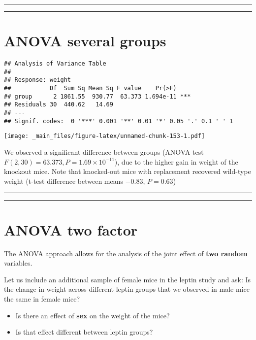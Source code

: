 \documentclass[
]{book}
\begin{document}
\begin{center}\rule{0.5\linewidth}{0.5pt}\end{center}

\begin{center}\rule{0.5\linewidth}{0.5pt}\end{center}

\hypertarget{anova-several-groups-4}{%
\section{ANOVA several groups}\label{anova-several-groups-4}}

\begin{verbatim}
## Analysis of Variance Table
## 
## Response: weight
##           Df  Sum Sq Mean Sq F value    Pr(>F)    
## group      2 1861.55  930.77  63.373 1.694e-11 ***
## Residuals 30  440.62   14.69                      
## ---
## Signif. codes:  0 '***' 0.001 '**' 0.01 '*' 0.05 '.' 0.1 ' ' 1
\end{verbatim}

\texttt{[image: \_main\_files/figure-latex/unnamed-chunk-153-1.pdf]}

We observed a significant difference between groups (ANOVA test \(F(2,30)=63.373, P= 1.69 \times 10^{-11}\)), due to the higher gain in weight of the knockout mice. Note that knocked-out mice with replacement recovered wild-type weight (t-test difference between means \(-0.83\), \(P=0.63\))

\begin{center}\rule{0.5\linewidth}{0.5pt}\end{center}

\begin{center}\rule{0.5\linewidth}{0.5pt}\end{center}

\hypertarget{anova-two-factor}{%
\section{ANOVA two factor}\label{anova-two-factor}}

The ANOVA approach allows for the analysis of the joint effect of \textbf{two random} variables.

Let us include an additional sample of female mice in the leptin study and ask: Is the change in weight across different leptin groups that we observed in male mice the same in female mice?

\begin{itemize}
\item
  Is there an effect of \textbf{sex} on the weight of the mice?
\item
  Is that effect different between leptin groups?
\end{itemize}
\end{document}
